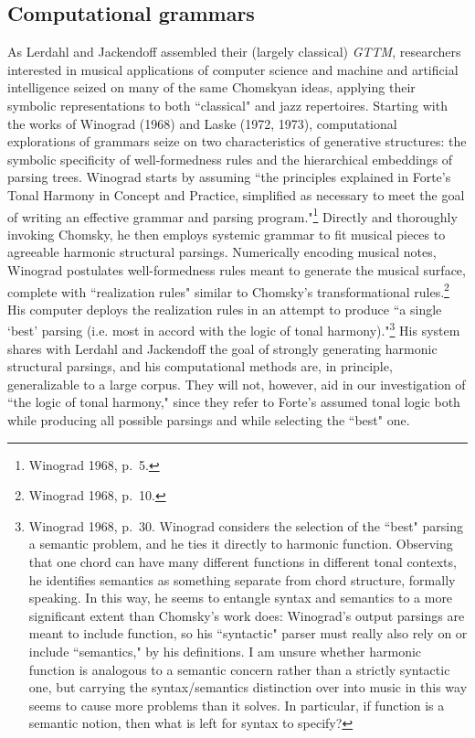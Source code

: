 \subsection{Computational grammars} %
As Lerdahl and Jackendoff assembled their (largely classical) \emph{GTTM}, researchers interested in musical applications of computer science and machine and artificial intelligence seized on many of the same Chomskyan ideas, applying their symbolic representations to both ``classical" and jazz repertoires.  Starting with the works of Winograd (1968) and Laske (1972, 1973), computational explorations of grammars seize on two characteristics of generative structures: the symbolic specificity of well-formedness rules and the hierarchical embeddings of parsing trees.  Winograd starts by assuming ``the principles explained in Forte's Tonal Harmony in Concept and Practice, simplified as necessary to meet the goal of writing an effective grammar and parsing program."\footnote{Winograd 1968, p.\ 5.}  Directly and thoroughly invoking Chomsky, he then employs systemic grammar to fit musical pieces to agreeable harmonic structural parsings.  Numerically encoding musical notes, Winograd postulates well-formedness rules meant to generate the musical surface, complete with ``realization rules" similar to Chomsky's transformational rules.\footnote{Winograd 1968, p.\ 10.}  His computer deploys the realization rules in an attempt to produce ``a single `best' parsing (i.e. most in accord with the logic of tonal harmony)."\footnote{Winograd 1968, p.\ 30.  Winograd considers the selection of the ``best" parsing a semantic problem, and he ties it directly to harmonic function.  Observing that one chord can have many different functions in different tonal contexts, he identifies semantics as something separate from chord structure, formally speaking.  In this way, he seems to entangle syntax and semantics to a more significant extent than Chomsky's work does: Winograd's output parsings are meant to include function, so his ``syntactic" parser must really also rely on or include ``semantics," by his definitions.  I am unsure whether harmonic function is analogous to a semantic concern rather than a strictly syntactic one, but carrying the syntax/semantics distinction over into music in this way seems to cause more problems than it solves.  In particular, if function is a semantic notion, then what is left for syntax to specify?}  His system shares with Lerdahl and Jackendoff the goal of strongly generating harmonic structural parsings, and his computational methods are, in principle, generalizable to a large corpus.  They will not, however, aid in our investigation of ``the logic of tonal harmony," since they refer to Forte's assumed tonal logic both while producing all possible parsings and while selecting the ``best" one.

